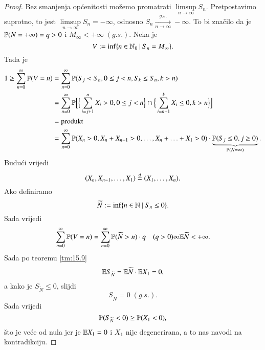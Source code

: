 \begin{proof}
    Bez smanjenja op\' cenitosti mo\v zemo promatrati $\limsup\limits_{n \to \infty} S_n$.
    Pretpostavimo suprotno, to jest $\limsup\limits_{n \to \infty} S_n = -\infty$, odnosno $S_n \xrightarrow[n \to \infty]{g.s.} -\infty$.
    To bi zna\v cilo da je $\mathbb{P} (N = +\infty) = q > 0$ i $M_\infty < +\infty \; (g.s.)$.
    Neka je
    \begin{equation*}
        V := \inf \{{n \in \mathbb{N}_0} \: | \: {S_n = M_\infty}\}.
    \end{equation*}
    Tada je
    \begin{equation*}
        \begin{aligned}
            1 \geq \sum\limits_{n = 0}^{\infty} \mathbb{P} (V = n) &= \sum\limits_{n = 0}^{\infty} \mathbb{P} (S_j < S_n, 0 \leq j < n, S_k \leq S_n, k > n)\\
            &= \sum\limits_{n = 0}^{\infty} \mathbb{P} \Big[ \Big\{ \sum\limits_{i = j + 1}^{n} X_i > 0, 0 \leq j < n \Big\} \cap \Big\{  \sum\limits_{i = n + 1}^{k} X_i \leq 0, k > n \Big\} \Big]\\
            &= \textnormal{produkt}\\
            &= \sum\limits_{n = 0}^{\infty} \mathbb{P} (X_n > 0, X_n + X_{n-1} > 0, \ldots, X_n + \ldots + X_1 > 0) \cdot \underbrace{\mathbb{P} (S_j \leq 0, j \geq 0)}_{\mathbb{P} (N = \infty)}.
        \end{aligned}
    \end{equation*}
    Budu\' ci vrijedi
    \begin{equation*}
        (X_n, X_{n - 1}, \ldots, X_1) \overset{d}{=} (X_1, \ldots, X_n).
    \end{equation*}
    Ako definiramo
    \begin{equation*}
        \widetilde{N} := \inf \{{n \in \mathbb{N}} \: | \: {S_n \leq 0}\}.
    \end{equation*}
    Sada vrijedi
    \begin{equation*}
        \sum\limits_{n = 0}^{\infty} \mathbb{P} (V = n) = \sum\limits_{n = 0}^{\infty} \mathbb{P} (\widetilde{N} > n) \cdot q \quad (q > 0) \infty \mathbb{E} \widetilde{N} < +\infty.
    \end{equation*}
    Sada po teoremu \ref{tm:15.9}
    \begin{equation*}
        \mathbb{E} S_{\widetilde{N}} = \mathbb{E} \widetilde{N} \cdot \mathbb{E} X_1 = 0,
    \end{equation*}
    a kako je $S_{\widetilde{N}} \leq 0$, slijdi
    \begin{equation*}
        S_{\widetilde{N}} = 0 \; (g.s.).
    \end{equation*}
    Sada vrijedi
    \begin{equation*}
        \mathbb{P} (S_{\widetilde{N}} < 0) \geq \mathbb{P} (X_1 < 0), 
    \end{equation*}
    \v sto je ve\' ce od nula jer je $\mathbb{E} X_1 = 0$ i $X_1$ nije degenerirana, a to nas navodi na kontradikciju.
\end{proof}